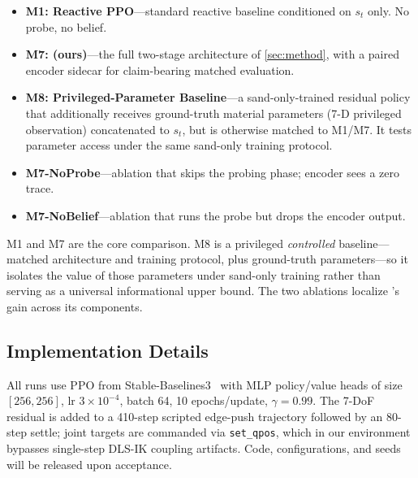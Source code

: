 \begin{itemize}
    \item \textbf{M1: Reactive PPO}---standard reactive baseline conditioned on $s_t$ only. No probe, no belief.
    \item \textbf{M7: \PTA{} (ours)}---the full two-stage architecture of \cref{sec:method}, with a paired encoder sidecar for claim-bearing matched evaluation.
    \item \textbf{M8: Privileged-Parameter Baseline}---a sand-only-trained residual policy that additionally receives ground-truth material parameters (7-D privileged observation) concatenated to $s_t$, but is otherwise matched to M1/M7. It tests parameter access under the same sand-only training protocol.
    \item \textbf{M7-NoProbe}---ablation that skips the probing phase; encoder sees a zero trace.
    \item \textbf{M7-NoBelief}---ablation that runs the probe but drops the encoder output.
\end{itemize}

M1 and M7 are the core comparison. M8 is a privileged \emph{controlled} baseline---matched architecture and training protocol, plus ground-truth parameters---so it isolates the value of those parameters under sand-only training rather than serving as a universal informational upper bound. The two ablations localize \PTA{}'s gain across its components.

\subsection{Implementation Details}

All runs use PPO from Stable-Baselines3~\cite{raffin2021stable} with MLP policy/value heads of size $[256,256]$, lr $3\times10^{-4}$, batch 64, 10 epochs/update, $\gamma=0.99$. The 7-DoF residual is added to a 410-step scripted edge-push trajectory followed by an 80-step settle; joint targets are commanded via \texttt{set\_qpos}, which in our environment bypasses single-step DLS-IK coupling artifacts. Code, configurations, and seeds will be released upon acceptance.
